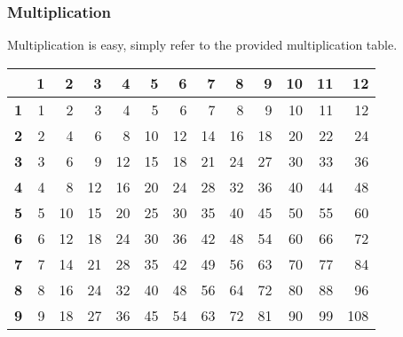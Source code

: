 \documentclass[a4paper]{article}
\theoremstyle{plain}
\theoremstyle{definition}
\theoremstyle{remark}
\begin{document}
        \subsubsection{Multiplication}
        Multiplication is easy, simply refer to the provided multiplication table.
        \begin{table}[H]
            \centering
            \begin{tabular}{r|rrrrrrrrrrrr}
                        & \textbf{1} & \textbf{2} & \textbf{3} & \textbf{4} & \textbf{5} & \textbf{6} & \textbf{7} & \textbf{8} & \textbf{9} & \textbf{10} & \textbf{11} & \textbf{12} \\ \hline
            \textbf{1}  & 1          & 2          & 3          & 4          & 5          & 6          & 7          & 8          & 9          & 10          & 11          & 12          \\
            \textbf{2}  & 2          & 4          & 6          & 8          & 10         & 12         & 14         & 16         & 18         & 20          & 22          & 24          \\
            \textbf{3}  & 3          & 6          & 9          & 12         & 15         & 18         & 21         & 24         & 27         & 30          & 33          & 36          \\
            \textbf{4}  & 4          & 8          & 12         & 16         & 20         & 24         & 28         & 32         & 36         & 40          & 44          & 48          \\
            \textbf{5}  & 5          & 10         & 15         & 20         & 25         & 30         & 35         & 40         & 45         & 50          & 55          & 60          \\
            \textbf{6}  & 6          & 12         & 18         & 24         & 30         & 36         & 42         & 48         & 54         & 60          & 66          & 72          \\
            \textbf{7}  & 7          & 14         & 21         & 28         & 35         & 42         & 49         & 56         & 63         & 70          & 77          & 84          \\
            \textbf{8}  & 8          & 16         & 24         & 32         & 40         & 48         & 56         & 64         & 72         & 80          & 88          & 96          \\
            \textbf{9}  & 9          & 18         & 27         & 36         & 45         & 54         & 63         & 72         & 81         & 90          & 99          & 108         \\

\end{tabular}
\end{table}
\end{document}
